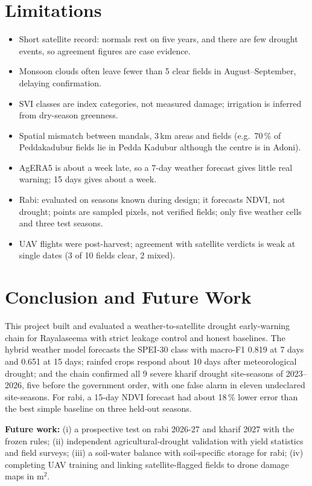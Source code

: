 \documentclass[11pt,a4paper,oneside]{article}
\newcommand{\mf}{macro-F1}
\begin{document}
\section{Limitations}
\begin{itemize}
\item Short satellite record: normals rest on five years, and there are few drought events, so agreement figures are case evidence.
\item Monsoon clouds often leave fewer than 5 clear fields in August--September, delaying confirmation.
\item SVI classes are index categories, not measured damage; irrigation is inferred from dry-season greenness.
\item Spatial mismatch between mandals, 3\,km areas and fields (e.g.\ 70\,\% of Peddakadubur fields lie in Pedda Kadubur although the centre is in Adoni).
\item AgERA5 is about a week late, so a 7-day weather forecast gives little real warning; 15 days gives about a week.
\item Rabi: evaluated on seasons known during design; it forecasts NDVI, not drought; points are sampled pixels, not verified fields; only five weather cells and three test seasons.
\item UAV flights were post-harvest; agreement with satellite verdicts is weak at single dates (3 of 10 fields clear, 2 mixed).
\end{itemize}

\section{Conclusion and Future Work}
This project built and evaluated a weather-to-satellite drought early-warning chain for Rayalaseema with strict leakage control and honest baselines. The hybrid weather model forecasts the SPEI-30 class with \mf{} 0.819 at 7 days and 0.651 at 15 days; rainfed crops respond about 10 days after meteorological drought; and the chain confirmed all 9 severe kharif drought site-seasons of 2023--2026, five before the government order, with one false alarm in eleven undeclared site-seasons. For rabi, a 15-day NDVI forecast had about 18\,\% lower error than the best simple baseline on three held-out seasons.

\textbf{Future work:} (i) a prospective test on rabi 2026-27 and kharif 2027 with the frozen rules; (ii) independent agricultural-drought validation with yield statistics and field surveys; (iii) a soil-water balance with soil-specific storage for rabi; (iv) completing UAV training and linking satellite-flagged fields to drone damage maps in m$^2$.
\end{document}
